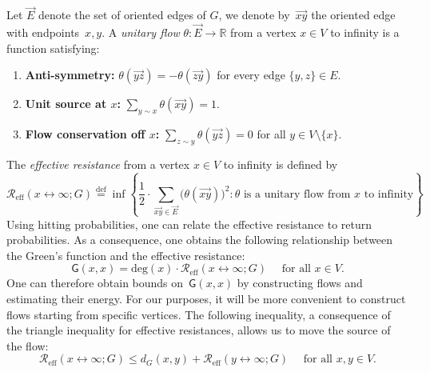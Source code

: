 \documentclass[a4paper,11pt]{article}
\newcommand{\eqdef}{\stackrel{\mathrm{def}}{=}}
\theoremstyle{definition}
\begin{document}
Let $\overrightarrow{E}$ denote the set of oriented edges of $G$, we denote by~$\overrightarrow{xy}$ the oriented edge with endpoints~$x,y$. A \emph{unitary flow} $\theta:\overrightarrow{E}\to\mathbb{R}$ from a vertex $x\in V$ to infinity is a function satisfying:
\begin{enumerate}
    \item \textbf{Anti-symmetry:} $\theta(\overrightarrow{yz})=-\theta(\overrightarrow{zy})$ for every edge $\{y,z\}\in E$.
    \item \textbf{Unit source at $x$:} $\displaystyle \sum_{y\sim x}\theta(\overrightarrow{xy})=1$.
    \item \textbf{Flow conservation off $x$:} $\displaystyle \sum_{z\sim y}\theta(\overrightarrow{yz})=0$ for all $y\in V\setminus\{x\}$.
\end{enumerate}
The \emph{effective resistance} from a vertex $x \in V$ to infinity is defined by 
\begin{equation*}
    \mathcal{R}_\mathrm{eff}(x\longleftrightarrow \infty;G) \eqdef \inf \left\{ \frac{1}{2} \cdot \sum_{ \overrightarrow{xy} \in \overrightarrow{E} }  \big( \theta(\overrightarrow{xy}) \big)^2 : \theta \text{ is a unitary flow from } x \text{ to infinity} \right\}
\end{equation*}
Using hitting probabilities, one can relate the effective resistance to return probabilities. As a consequence, one obtains the following relationship between the Green's function and the effective resistance:
\begin{equation}\label{eq_Green_and_Resistance}
    \mathsf{G}(x,x) = \mathrm{deg}(x) \cdot \mathcal{R}_\mathrm{eff}(x\longleftrightarrow \infty;G) \quad \text{ for all } x \in V.
\end{equation}
One can therefore obtain bounds on~$\mathsf G(x,x)$ by constructing flows and estimating their energy. For our purposes, it will be more convenient to construct flows starting from specific vertices. The following inequality, a consequence of the triangle inequality for effective resistances, allows us to move the source of the flow:
\begin{equation}\label{ineq_R_eff_distance_G}
\mathcal{R}_\mathrm{eff}(x\longleftrightarrow \infty;G) \leq d_G(x,y) + \mathcal{R}_\mathrm{eff}(y \longleftrightarrow \infty;G) \quad \text{ for all } x,y \in V.
\end{equation}
\end{document}
